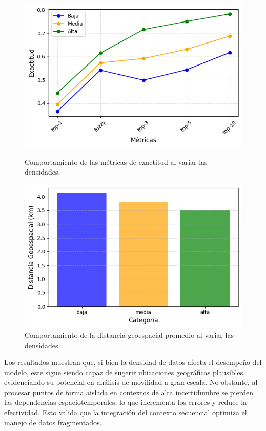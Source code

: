 \begin{figure}[!htb]
\centering
\begin{minipage}{0.45\textwidth}
    \centering
    \includegraphics[width=\textwidth]{Graphics/accuracy_metrics.png}
    \caption{Comportamiento de las métricas de exactitud al variar las densidades.}
    \label{fig:accuracy_metrics}
\end{minipage}%
\hfill
\begin{minipage}{0.45\textwidth}
    \centering
    \includegraphics[width=\textwidth]{Graphics/geospatial_distance.png}
    \caption{Comportamiento de la distancia geoespacial promedio al variar las densidades.}
    \label{fig:geospatial_distance}
\end{minipage}%
\end{figure}

Los resultados muestran que, si bien la densidad de datos afecta el desempeño del modelo, este sigue siendo capaz de sugerir ubicaciones geográficas plausibles, evidenciando su potencial en análisis de movilidad a gran escala. No obstante, al procesar puntos de forma aislada en contextos de alta incertidumbre se pierden las dependencias espaciotemporales, lo que incrementa los errores y reduce la efectividad. Esto valida que la integración del contexto secuencial optimiza el manejo de datos fragmentados.

